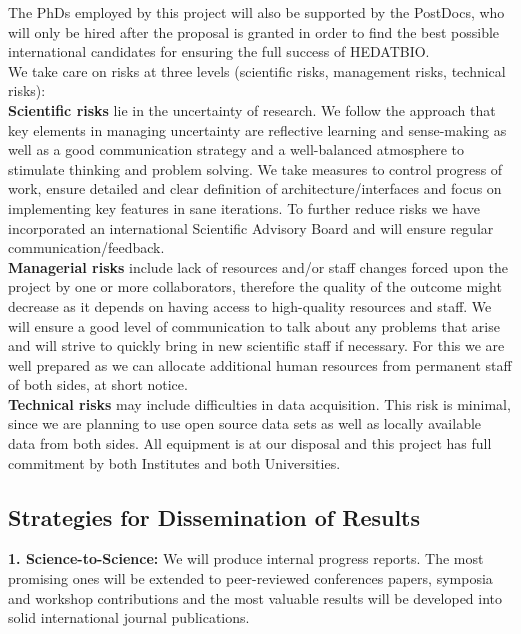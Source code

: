 \documentclass[a4paper,11pt]{article}
\begin{document}
The PhDs employed by this project will also be supported by the PostDocs, who will only be hired after the proposal is granted in order to find the best possible international candidates for ensuring the full success of HEDATBIO.
\\[0,2cm]
We take care on risks at three levels (scientific risks, management risks, technical risks):
\\[0,2cm]
\textbf{Scientific risks} lie in the uncertainty of research. We follow the approach that key elements in managing uncertainty are reflective learning and sense-making as well as a good communication strategy and a well-balanced atmosphere to stimulate thinking and problem solving. 
We take measures to control progress of work, ensure detailed and clear definition of architecture/interfaces and focus on implementing key features in sane iterations. To further reduce risks we have incorporated an international Scientific Advisory Board and will ensure regular communication/feedback.
\\[0,2cm]
\textbf{Managerial risks} include lack of resources and/or staff changes forced upon the project by one or more collaborators, therefore the quality of the outcome might decrease as it depends on having access to high-quality resources and staff. We will ensure a good level of communication to talk about any problems that arise and will strive to quickly bring in new scientific staff if necessary. For this we are well prepared as we can allocate additional human resources from permanent staff of both sides, at short notice.
\\[0,2cm]
\textbf{Technical risks} may include difficulties in data acquisition. This risk is minimal, since we are planning to use open source data sets as well as locally available data from both sides. All equipment is at our disposal and this project has full commitment by both Institutes and both Universities. 

\subsection{Strategies for Dissemination of Results}

\textbf{1. Science-to-Science:} We will produce internal progress reports. The most promising ones will be extended to peer-reviewed conferences papers, symposia and workshop contributions and the most valuable results will be developed into solid international journal publications.
\end{document}
